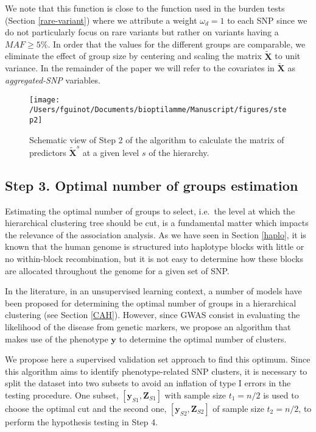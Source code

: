 \documentclass[]{book}
\begin{document}
We note that this function is close to the function used in the burden
tests (Section \ref{rare-variant}) where we attribute a weight
\(\omega_d = 1\) to each SNP since we do not particularly focus on rare
variants but rather on variants having a \(MAF \geq 5\%\). In order that
the values for the different groups are comparable, we eliminate the
effect of group size by centering and scaling the matrix \(\tilde{\mathbf{X}}\)
to unit variance. In the remainder of the paper we will refer to the
covariates in \(\tilde{\mathbf{X}}\) as \emph{aggregated-SNP} variables.



\begin{figure}

{\centering \texttt{[image: /Users/fguinot/Documents/bioptilamme/Manuscript/figures/step2]} 

}

\caption{Schematic view of Step 2 of the algorithm to calculate the matrix of predictors \(\tilde{\mathbf{X}}^s\) at a given level \(s\) of the hierarchy.}\label{fig:step2}
\end{figure}

\hypertarget{cutree}{%
\subsection{Step 3. Optimal number of groups estimation}\label{cutree}}

Estimating the optimal number of groups to select, i.e.~the level at
which the hierarchical clustering tree should be cut, is a fundamental
matter which impacts the relevance of the association analysis. As we
have seen in Section \ref{haplo}, it is known that the human genome is
structured into haplotype blocks with little or no within-block
recombination, but it is not easy to determine how these blocks are
allocated throughout the genome for a given set of SNP.

In the literature, in an unsupervised learning context, a number of
models have been proposed for determining the optimal number of groups
in a hierarchical clustering (see Section \ref{CAH}). However, since
GWAS consist in evaluating the likelihood of the disease from genetic
markers, we propose an algorithm that makes use of the phenotype \(\mathbf{y}\)
to determine the optimal number of clusters.

We propose here a supervised validation set approach to find this
optimum. Since this algorithm aims to identify phenotype-related SNP
clusters, it is necessary to split the dataset into two subsets to avoid
an inflation of type I errors in the testing procedure. One subset,
\([\mathbf{y}_{S1}, \mathbf{Z}_{S1}]\) with sample size \(t_1 = n/2\) is used to choose
the optimal cut and the second one, \([\mathbf{y}_{S2}, \mathbf{Z}_{S2}]\) of sample
size \(t_2=n/2\), to perform the hypothesis testing in Step 4.
\end{document}
